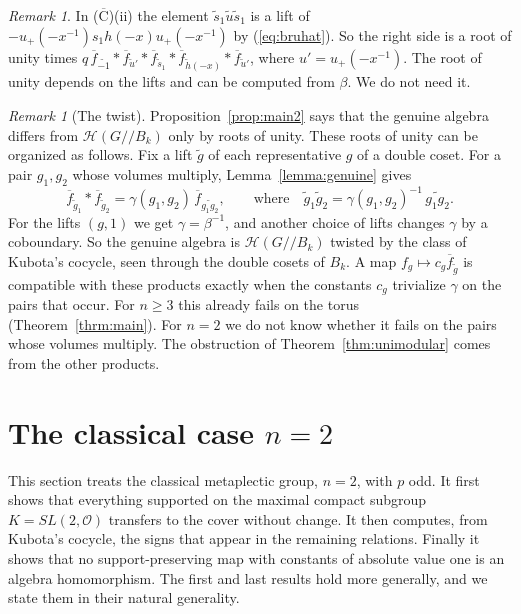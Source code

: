 \documentclass[12pt,letterpaper]{amsart}
\numberwithin{equation}{section}
\theoremstyle{definition}
\theoremstyle{remark}
\newtheorem{remark}[theorem]{Remark}
\newcommand{\cO}{\mathcal{O}}
\newcommand{\cH}{\mathcal{H}}
\newcommand{\fbar}{\overline{f}}
\newcommand{\Hlin}{\cH(G/\!/B_k)}
\begin{document}
\begin{remark}
In ($\overline{\mbox{C}}$)(ii) the element
$\tilde s_1\tilde u\tilde s_1$ is a lift of
$-u_+(-x^{-1})s_1h(-x)u_+(-x^{-1})$ by (\ref{eq:bruhat}). So the right
side is a root of unity times
$q\,\fbar_{\widetilde{-1}}*\fbar_{\tilde u'}*\fbar_{\tilde s_1}*
\fbar_{\tilde h(-x)}*\fbar_{\tilde u'}$, where $u'=u_+(-x^{-1})$. The
root of unity depends on the lifts and can be computed from $\beta$.
We do not need it.
\end{remark}

\begin{remark}[The twist]
\label{rem:twist}
Proposition~\ref{prop:main2} says that the genuine algebra differs from
$\Hlin$ only by roots of unity. These roots of unity can be organized
as follows. Fix a lift $\tilde g$ of each representative $g$ of a double
coset. For a pair $g_1,g_2$ whose volumes multiply,
Lemma~\ref{lemma:genuine} gives
\[
\fbar_{\tilde g_1}*\fbar_{\tilde g_2}
=\gamma(g_1,g_2)\,\fbar_{\widetilde{g_1g_2}},
\qquad\mbox{where}\quad
\tilde g_1\tilde g_2=\gamma(g_1,g_2)^{-1}\,\widetilde{g_1g_2}.
\]
For the lifts $(g,1)$ we get $\gamma=\beta^{-1}$, and another choice of
lifts changes $\gamma$ by a coboundary. So the genuine algebra is
$\Hlin$ twisted by the class of Kubota's cocycle, seen through the
double cosets of $B_k$. A map $f_g\mapsto c_g\fbar_{\tilde g}$ is
compatible with these products exactly when the constants $c_g$
trivialize $\gamma$ on the pairs that occur. For $n\geq 3$ this already
fails on the torus (Theorem~\ref{thrm:main}). For $n=2$ we do not know
whether it fails on the pairs whose volumes multiply. The obstruction
of Theorem~\ref{thm:unimodular} comes from the other products.
\end{remark}



\section{The classical case \texorpdfstring{$n=2$}{n=2}}
\label{section:n2}

This section treats the classical metaplectic group, $n=2$, with $p$
odd. It first shows that everything supported on the maximal compact
subgroup $K=SL(2,\cO)$ transfers to the cover without change. It then
computes, from Kubota's cocycle, the signs that appear in the remaining
relations. Finally it shows that no support-preserving map with
constants of absolute value one is an algebra homomorphism. The first
and last results hold more generally, and we state them in their
natural generality.
\end{document}
